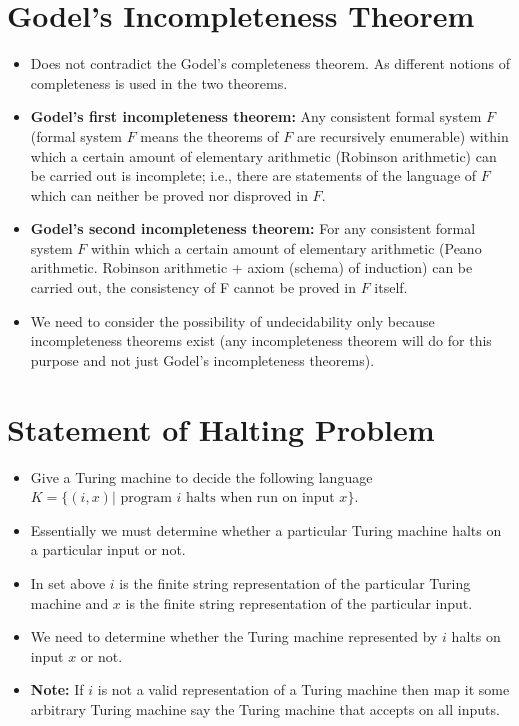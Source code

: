 \documentclass[
11pt,notheorems,hyperref={pdfauthor=whatever}
]{beamer}
\begin{document}
\section{Godel's Incompleteness Theorem}
\begin{frame}
\begin{itemize}
    \setlength\itemsep{1em}
    \item Does not contradict the Godel's completeness theorem. As different notions of completeness is used in the two theorems.
    \item \textbf{Godel's first incompleteness theorem: } Any consistent formal system $F$ (formal system $F$ means the theorems of $F$ are recursively enumerable) within which a certain amount of elementary arithmetic (Robinson arithmetic) can be carried out is incomplete; i.e., there are statements of the language of $F$ which can neither be proved nor disproved in $F$. \cite{raatikainen2013godel}
    \item \textbf{Godel's second incompleteness theorem: } For any consistent formal system $F$ within which a certain amount of elementary arithmetic (Peano arithmetic. Robinson arithmetic + axiom (schema) of induction) can be carried out, the consistency of F cannot be proved in $F$ itself. \cite{raatikainen2013godel}
    \item We need to consider the possibility of undecidability only because incompleteness theorems exist (any incompleteness theorem will do for this purpose and not just Godel's incompleteness theorems).
\end{itemize}
\end{frame}


\section{Statement of Halting Problem}
\begin{frame}
\begin{itemize}
    \setlength\itemsep{1em}
    \item Give a Turing machine to decide the following language $K = \{(i, x) | \text{ program } i \text{ halts when run on input } x\}$.
    \item Essentially we must determine whether a particular Turing machine halts on a particular input or not.
    \item In set above $i$ is the finite string representation of the particular Turing machine and $x$ is the finite string representation of the particular input.
    \item We need to determine whether the Turing machine represented by $i$ halts on input $x$ or not.
    \item \textbf{Note: } If $i$ is not a valid representation of a Turing machine then map it some arbitrary Turing machine say the Turing machine that accepts on all inputs.
\end{itemize}
\end{frame}
\end{document}
